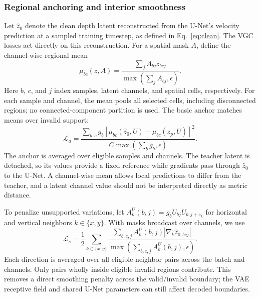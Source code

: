 \documentclass[10pt,journal,a4paper]{IEEEtran}
\begin{document}
\subsubsection{Regional anchoring and interior smoothness}
Let $\hat z_0$ denote the clean depth latent reconstructed from the U-Net's velocity prediction at a sampled training timestep, as defined in Eq.~\eqref{eq:clean}. The VGC losses act directly on this reconstruction. For a spatial mask $A$, define the channel-wise regional mean
\begin{equation}
	\mu_{bc}(z,A)=\frac{\sum_j A_{bj}z_{bcj}}
	{\max(\sum_j A_{bj},\epsilon)}.
	\label{eq:region_mean}
\end{equation}
Here $b$, $c$, and $j$ index samples, latent channels, and spatial cells, respectively. For each sample and channel, the mean pools all selected cells, including disconnected regions; no connected-component partition is used. The basic anchor matches means over invalid support:
\begin{equation}
	\mathcal L_a=
	\frac{\sum_{b,c}g_b[\mu_{bc}(\hat z_0,U)-\mu_{bc}(z_p,U)]^2}
	{C\max(\sum_b g_b,\epsilon)}.
	\label{eq:anchor}
\end{equation}
The anchor is averaged over eligible samples and channels. The teacher latent is detached, so its values provide a fixed reference while gradients pass through $\hat z_0$ to the U-Net. A channel-wise mean allows local predictions to differ from the teacher, and a latent channel value should not be interpreted directly as metric distance.

To penalize unsupported variations, let $A^U_k(b,j)=g_bU_{bj}U_{b,j+e_k}$ for horizontal and vertical neighbors $k\in\{x,y\}$. With masks broadcast over channels, we use
\begin{equation}
	\mathcal L_s=\frac12\sum_{k\in\{x,y\}}
	\frac{\sum_{b,c,j} A^U_k(b,j)|\nabla_k\hat z_{0,bcj}|}
	{\max(\sum_{b,c,j} A^U_k(b,j),\epsilon)}.
	\label{eq:smooth}
\end{equation}
Each direction is averaged over all eligible neighbor pairs across the batch and channels. Only pairs wholly inside eligible invalid regions contribute. This removes a direct smoothing penalty across the valid/invalid boundary; the VAE receptive field and shared U-Net parameters can still affect decoded boundaries.
\end{document}
